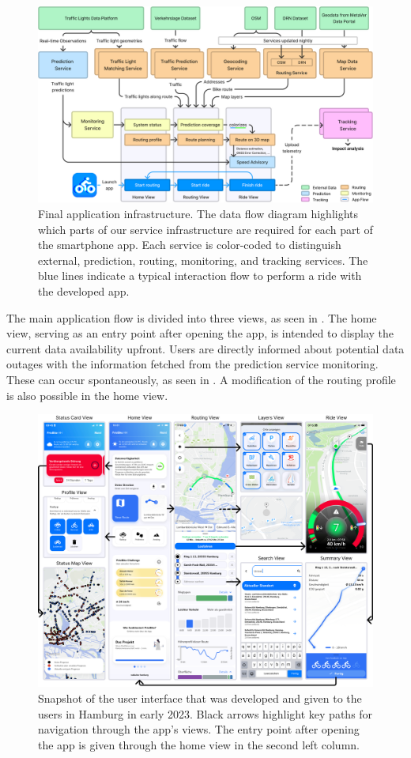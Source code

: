\begin{figure}[!b]
\caption{Final application infrastructure. The data flow diagram highlights which parts of our service infrastructure are required for each part of the smartphone app. Each service is color-coded to distinguish external, prediction, routing, monitoring, and tracking services. The blue lines indicate a typical interaction flow to perform a ride with the developed app.}\label{fig:architecture}
\includegraphics[width=\linewidth]{images/architecture.pdf}
\end{figure}

The main application flow is divided into three views, as seen in . The home view, serving as an entry point after opening the app, is intended to display the current data availability upfront. Users are directly informed about potential data outages with the information fetched from the prediction service monitoring. These can occur spontaneously, as seen in . A modification of the routing profile is also possible in the home view.

\begin{figure}[t]
\caption{Snapshot of the user interface that was developed and given to the users in Hamburg in early 2023. Black arrows highlight key paths for navigation through the app's views. The entry point after opening the app is given through the home view in the second left column.}\label{fig:app}
\includegraphics[width=\linewidth]{images/app.png}
\end{figure}

